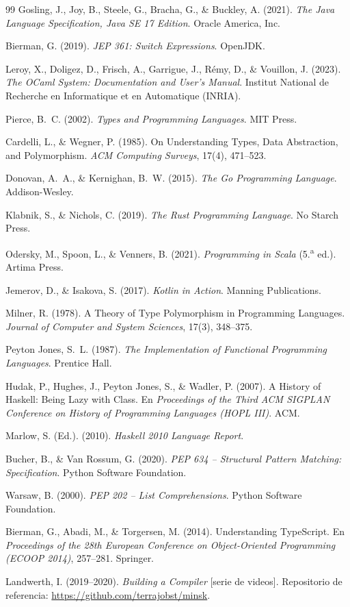 \documentclass[12pt, a4paper]{article}
\begin{document}
\begin{thebibliography}{99}
Gosling, J., Joy, B., Steele, G., Bracha, G., \& Buckley, A. (2021).
\textit{The Java Language Specification, Java SE 17 Edition}. Oracle
America, Inc.

Bierman, G. (2019). \textit{JEP 361: Switch Expressions}. OpenJDK.

Leroy, X., Doligez, D., Frisch, A., Garrigue, J., Rémy, D., \& Vouillon, J.
(2023). \textit{The OCaml System: Documentation and User's Manual}. Institut
National de Recherche en Informatique et en Automatique (INRIA).

Pierce, B.~C. (2002). \textit{Types and Programming Languages}. MIT Press.

Cardelli, L., \& Wegner, P. (1985). On Understanding Types, Data Abstraction,
and Polymorphism. \textit{ACM Computing Surveys}, 17(4), 471--523.

Donovan, A.~A., \& Kernighan, B.~W. (2015). \textit{The Go Programming
Language}. Addison-Wesley.

Klabnik, S., \& Nichols, C. (2019). \textit{The Rust Programming Language}.
No Starch Press.

Odersky, M., Spoon, L., \& Venners, B. (2021). \textit{Programming in Scala}
(5.\textsuperscript{a} ed.). Artima Press.

Jemerov, D., \& Isakova, S. (2017). \textit{Kotlin in Action}. Manning
Publications.

Milner, R. (1978). A Theory of Type Polymorphism in Programming Languages.
\textit{Journal of Computer and System Sciences}, 17(3), 348--375.

Peyton Jones, S.~L. (1987). \textit{The Implementation of Functional
Programming Languages}. Prentice Hall.

Hudak, P., Hughes, J., Peyton Jones, S., \& Wadler, P. (2007). A History of
Haskell: Being Lazy with Class. En \textit{Proceedings of the Third ACM
SIGPLAN Conference on History of Programming Languages (HOPL III)}. ACM.

Marlow, S. (Ed.). (2010). \textit{Haskell 2010 Language Report}.

Bucher, B., \& Van Rossum, G. (2020). \textit{PEP 634 -- Structural Pattern
Matching: Specification}. Python Software Foundation.

Warsaw, B. (2000). \textit{PEP 202 -- List Comprehensions}. Python Software
Foundation.

Bierman, G., Abadi, M., \& Torgersen, M. (2014). Understanding TypeScript.
En \textit{Proceedings of the 28th European Conference on Object-Oriented
Programming (ECOOP 2014)}, 257--281. Springer.

Landwerth, I. (2019--2020). \textit{Building a Compiler} [serie de videos].
Repositorio de referencia: \url{https://github.com/terrajobst/minsk}.

\end{thebibliography}
\end{document}
